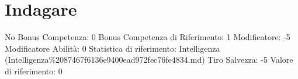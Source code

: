 \section{Indagare}\label{indagare}

\begin{description}
\tightlist
\item[Tags: ABI]
No Bonus Competenza: 0 Bonus Competenza di Riferimento: 1 Modificatore:
-5 Modificatore Abilità: 0 Statistica di riferimento: Intelligenza
(Intelligenza\%2087467f6136e9400ead972fec76fe4834.md) Tiro Salvezza: -5
Valore di riferimento: 0
\end{description}
